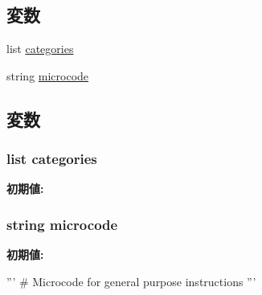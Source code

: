 \subsection*{変数}
\begin{DoxyCompactItemize}
\item 
list \hyperlink{namespaceinsts_1_1general__purpose_a273cf0f1630af14c1582f05e53354a55}{categories}
\item 
string \hyperlink{namespaceinsts_1_1general__purpose_a770f11a173e99389a8802f0107ed8f52}{microcode}
\end{DoxyCompactItemize}


\subsection{変数}
\hypertarget{namespaceinsts_1_1general__purpose_a273cf0f1630af14c1582f05e53354a55}{
\subsubsection[{categories}]{\setlength{\rightskip}{0pt plus 5cm}list {\bf categories}}}
\label{namespaceinsts_1_1general__purpose_a273cf0f1630af14c1582f05e53354a55}
{\bfseries 初期値:}
\begin{DoxyCode}
\end{DoxyCode}
\hypertarget{namespaceinsts_1_1general__purpose_a770f11a173e99389a8802f0107ed8f52}{
\subsubsection[{microcode}]{\setlength{\rightskip}{0pt plus 5cm}string {\bf microcode}}}
\label{namespaceinsts_1_1general__purpose_a770f11a173e99389a8802f0107ed8f52}
{\bfseries 初期値:}
\begin{DoxyCode}
'''
# Microcode for general purpose instructions
'''
\end{DoxyCode}
